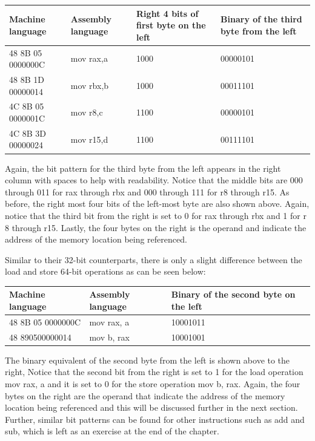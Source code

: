 \documentclass[10pt]{book}
\begin{document}
\begin{center}
\begin{tabular}{|l|l|l|l|}
\hline
Machine language & Assembly language & Right 4 bits of first byte on the left & Binary of the third byte from the left \\
\hline
48 8B 05 0000000C & mov rax,a & 1000 & 00000101 \\
\hline
48 8B 1D 00000014 & mov rbx,b & 1000 & 00011101 \\
\hline
4C 8B 05 0000001C & mov r8,c & 1100 & 00000101 \\
\hline
4C 8B 3D 00000024 & mov r15,d & 1100 & 00111101 \\
\hline
\end{tabular}
\end{center}

Again, the bit pattern for the third byte from the left appears in the right column with spaces to help with readability. Notice that the middle bits are 000 through 011 for rax through rbx and 000 through 111 for r8 through r15. As before, the right most four bits of the left-most byte are also shown above. Again, notice that the third bit from the right is set to 0 for rax through rbx and 1 for r 8 through r15. Lastly, the four bytes on the right is the operand and indicate the address of the memory location being referenced.

Similar to their 32-bit counterparts, there is only a slight difference between the load and store 64-bit operations as can be seen below:

\begin{center}
\begin{tabular}{|l|l|l|}
\hline
Machine language & Assembly language & Binary of the second byte on the left \\
\hline
48 8B 05 0000000C & mov rax, a & 10001011 \\
\hline
48 890500000014 & mov b, rax & 10001001 \\
\hline
\end{tabular}
\end{center}

The binary equivalent of the second byte from the left is shown above to the right, Notice that the second bit from the right is set to 1 for the load operation mov rax, a and it is set to 0 for the store operation mov b, rax. Again, the four bytes on the right are the operand that indicate the address of the memory location being referenced and this will be discussed further in the next section. Further, similar bit patterns can be found for other instructions such as add and sub, which is left as an exercise at the end of the chapter.
\end{document}
